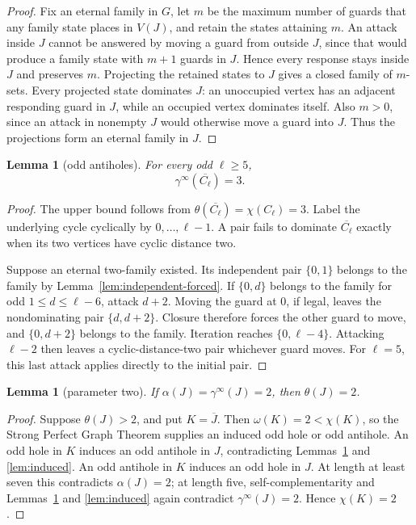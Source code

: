\documentclass[11pt]{article}
\newtheorem{lemma}[theorem]{Lemma}
\theoremstyle{definition}
\theoremstyle{remark}
\newcommand{\gaminf}{\gamma^{\infty}}
\begin{document}
\begin{proof}
Fix an eternal family in \(G\), let \(m\) be the maximum number of guards
that any family state places in \(V(J)\), and retain the states attaining
\(m\).  An attack inside \(J\) cannot be answered by moving a guard from
outside \(J\), since that would produce a family state with \(m+1\) guards
in \(J\).  Hence every response stays inside \(J\) and preserves \(m\).
Projecting the retained states to \(J\) gives a closed family of \(m\)-sets.
Every projected state dominates \(J\): an unoccupied vertex has an
adjacent responding guard in \(J\), while an occupied vertex dominates
itself.  Also \(m>0\), since an attack in nonempty \(J\) would otherwise
move a guard into \(J\).  Thus the projections form an eternal family in
\(J\).
\end{proof}

\begin{lemma}[odd antiholes]\label{lem:antihole}
For every odd \(\ell\geq5\),
\[
  \gaminf(\overline{C_\ell})=3.
\tag{2.5}
\]
\end{lemma}

\begin{proof}
The upper bound follows from
\(\theta(\overline{C_\ell})=\chi(C_\ell)=3\).
Label the underlying cycle cyclically by \(0,\ldots,\ell-1\).  A pair
fails to dominate \(\overline{C_\ell}\) exactly when its two vertices have
cyclic distance two.

Suppose an eternal two-family existed.  Its independent pair \(\{0,1\}\)
belongs to the family by Lemma~\ref{lem:independent-forced}.  If
\(\{0,d\}\) belongs to the family for odd
\(1\leq d\leq\ell-6\), attack \(d+2\).  Moving the guard at \(0\), if
legal, leaves the nondominating pair \(\{d,d+2\}\).  Closure therefore
forces the other guard to move, and \(\{0,d+2\}\) belongs to the family.
Iteration reaches \(\{0,\ell-4\}\).  Attacking \(\ell-2\) then leaves a
cyclic-distance-two pair whichever guard moves.  For \(\ell=5\), this
last attack applies directly to the initial pair.
\end{proof}

\begin{lemma}[parameter two]\label{lem:k2}
If \(\alpha(J)=\gaminf(J)=2\), then \(\theta(J)=2\).
\end{lemma}

\begin{proof}
Suppose \(\theta(J)>2\), and put \(K=\overline J\).  Then
\(\omega(K)=2<\chi(K)\), so the Strong Perfect Graph Theorem
\cite{ChudnovskyRobertsonSeymourThomas2006} supplies an induced odd hole
or odd antihole.  An odd hole in \(K\) induces an odd antihole in \(J\),
contradicting Lemmas~\ref{lem:antihole} and \ref{lem:induced}.  An odd
antihole in \(K\) induces an odd hole in \(J\).  At length at least seven
this contradicts \(\alpha(J)=2\); at length five,
self-complementarity and Lemmas~\ref{lem:antihole} and
\ref{lem:induced} again contradict \(\gaminf(J)=2\).
Hence \(\chi(K)=2\).
\end{proof}
\end{document}

